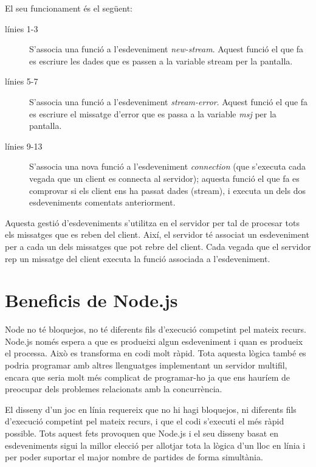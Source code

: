 El seu funcionament és el següent: 

\begin{description}
    \item[línies 1-3] {S'associa una funció a l'esdeveniment \emph{new-stream}. Aquest funció el que fa es escriure les dades que es passen a la variable stream per la pantalla.}
    \item[línies 5-7] {S'associa una funció a l'esdeveniment \emph{stream-error}. Aquest funció el que fa es escriure el missatge d'error que es passa a la variable \emph{msj} per la pantalla.}
  \item[línies 9-13] {S'associa una nova funció a l'esdeveniment \emph{connection} (que s'executa cada vegada que un client es connecta al servidor); aquesta funció el que fa es comprovar si els client ens ha passat dades (stream), i executa un dels dos esdeveniments comentats anteriorment.}
\end{description}

Aquesta gestió d'esdeveniments s'utilitza en el servidor per tal de procesar tots els missatges que es reben del client. Així, el servidor té associat un esdeveniment per a cada un dels missatges que pot rebre del client. Cada vegada que el servidor rep un missatge del client executa la funció associada a l'esdeveniment.

\section{Beneficis de Node.js}

Node no té bloquejos, no té diferents fils d'execució competint pel mateix recurs. Node.js només espera a que es produeixi algun esdeveniment i quan es produeix el processa. Això es transforma en codi molt ràpid. Tota aquesta lògica també es podria programar amb altres llenguatges implementant un servidor multifil, encara que seria molt més complicat de programar-ho ja que ens hauríem de preocupar dels problemes relacionats amb la concurrència. 

El disseny d'un joc en línia requereix que no hi hagi bloquejos, ni diferents fils d'execució competint pel mateix recurs, i que el codi s'executi el més ràpid possible. Tots aquest fets provoquen que Node.js i el seu disseny basat en esdeveniments sigui la millor elecció per allotjar tota la lògica d'un lloc en línia i per poder suportar el major nombre de partides de forma simultània.



